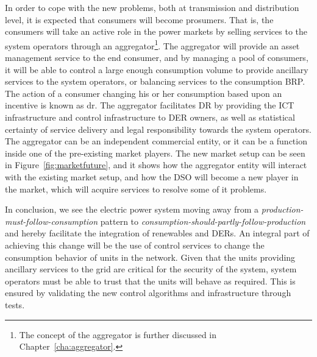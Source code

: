 In order to cope with the new problems, both at transmission and distribution level, it is expected that consumers will become prosumers. That is, the consumers will take an active role in the power markets by selling services to the system operators through an aggregator\footnote{The concept of the aggregator is further discussed in Chapter~\ref{cha:aggregator}.}. The aggregator will provide an asset management service to the end consumer, and by managing a pool of consumers, it will be able to control a large enough consumption volume to provide ancillary services to the system operators, or balancing services to the consumption BRP. The action of a consumer changing his or her consumption based upon an incentive is known as \gls{dr}. The aggregator facilitates DR by providing the ICT infrastructure and control infrastructure to DER owners, as well as statistical certainty of service delivery and legal responsibility towards the system operators. The aggregator can be an independent commercial entity, or it can be a function inside one of the pre-existing market players. The new market setup can be seen in Figure~\ref{fig:marketfuture}, and it shows how the aggregator entity will interact with the existing market setup, and how the DSO will become a new player in the market, which will acquire services to resolve some of it problems.

In conclusion, we see the electric power system moving away from a \emph{production-must-follow-consumption} pattern to \emph{consumption-should-partly-follow-production} and hereby facilitate the integration of renewables and DERs. An integral part of achieving this change will be the use of control services to change the consumption behavior of units in the network. Given that the units providing ancillary services to the grid are critical for the security of the system, system operators must be able to trust that the units will behave as required. This is ensured by validating the new control algorithms and infrastructure through tests.



